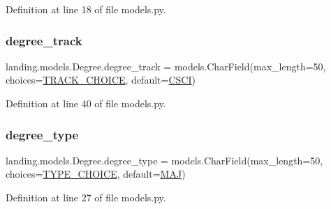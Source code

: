 Definition at line 18 of file models.\+py.

\mbox{\label{classlanding_1_1models_1_1Degree_a5dbec6bcca9df5d74244218ef8e75a5b}} 
\subsubsection{\texorpdfstring{degree\+\_\+track}{degree\_track}}
{\footnotesize\ttfamily landing.\+models.\+Degree.\+degree\+\_\+track = models.\+Char\+Field(max\+\_\+length=50, choices=\mbox{\hyperlink{classlanding_1_1models_1_1Degree_a63995a5c2aa1f03f1328238ebbd7ecd2}{T\+R\+A\+C\+K\+\_\+\+C\+H\+O\+I\+CE}}, default=\mbox{\hyperlink{classlanding_1_1models_1_1Degree_a818c1f18f64c3529a2bfcb746efb6600}{C\+S\+CI}})\hspace{0.3cm}{\ttfamily [static]}}



Definition at line 40 of file models.\+py.

\mbox{\label{classlanding_1_1models_1_1Degree_a15ee92cd794ad8c2dabf965723cfd949}} 
\subsubsection{\texorpdfstring{degree\+\_\+type}{degree\_type}}
{\footnotesize\ttfamily landing.\+models.\+Degree.\+degree\+\_\+type = models.\+Char\+Field(max\+\_\+length=50, choices=\mbox{\hyperlink{classlanding_1_1models_1_1Degree_a2e0c65757b0f59ed5c62ee8b2d517300}{T\+Y\+P\+E\+\_\+\+C\+H\+O\+I\+CE}}, default=\mbox{\hyperlink{classlanding_1_1models_1_1Degree_ad19df1851aacc963e0bc67c2a7097aec}{M\+AJ}})\hspace{0.3cm}{\ttfamily [static]}}



Definition at line 27 of file models.\+py.

\mbox{\label{classlanding_1_1models_1_1Degree_ab548201fcb3ef2b2455ba7311fdfcb26}} 

